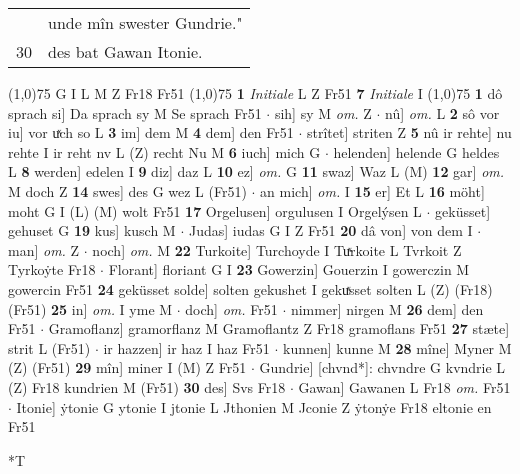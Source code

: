 \documentclass[8pt,a4paper,notitlepage]{article}
\begin{document}
\begin{table}[ht]
\begin{minipage}[t]{0.5\linewidth}
\begin{tabular}{rl}
 & unde mîn swester Gundrie."\\ 
30 & des bat Gawan Itonie.\\ 
\end{tabular}
\scriptsize
\line(1,0){75} \newline
G I L M Z Fr18 Fr51 \newline
\line(1,0){75} \newline
\textbf{1} \textit{Initiale} L Z Fr51  \textbf{7} \textit{Initiale} I  \newline
\line(1,0){75} \newline
\textbf{1} dô sprach si] Da sprach sy M Se sprach Fr51  $\cdot$ sih] sy M \textit{om.} Z  $\cdot$ nû] \textit{om.} L \textbf{2} sô vor iu] vor uͯch so L \textbf{3} im] dem M \textbf{4} dem] den Fr51  $\cdot$ strîtet] striten Z \textbf{5} nû ir rehte] nu rehte I ir reht nv L (Z) recht Nu M \textbf{6} iuch] mich G  $\cdot$ helenden] helende G heldes L \textbf{8} werden] edelen I \textbf{9} diz] daz L \textbf{10} ez] \textit{om.} G \textbf{11} swaz] Waz L (M) \textbf{12} gar] \textit{om.} M doch Z \textbf{14} swes] des G wez L (Fr51)  $\cdot$ an mich] \textit{om.} I \textbf{15} er] Et L \textbf{16} möht] moht G I (L) (M) wolt Fr51 \textbf{17} Orgelusen] orgulusen I Orgelýsen L  $\cdot$ geküsset] gehuset G \textbf{19} kus] kusch M  $\cdot$ Judas] iudas G I Z Fr51 \textbf{20} dâ von] von dem I  $\cdot$ man] \textit{om.} Z  $\cdot$ noch] \textit{om.} M \textbf{22} Turkoite] Turchoyde I Tuͯrkoite L Tvrkoit Z Tyrkoẏte Fr18  $\cdot$ Florant] floriant G I \textbf{23} Gowerzin] Gouerzin I gowerczin M gowercin Fr51 \textbf{24} geküsset solde] solten gekushet I gekuͯsset solten L (Z) (Fr18) (Fr51) \textbf{25} in] \textit{om.} I yme M  $\cdot$ doch] \textit{om.} Fr51  $\cdot$ nimmer] nirgen M \textbf{26} dem] den Fr51  $\cdot$ Gramoflanz] gramorflanz M Gramoflantz Z Fr18 gramoflans Fr51 \textbf{27} stæte] strit L (Fr51)  $\cdot$ ir hazzen] ir haz I haz Fr51  $\cdot$ kunnen] kunne M \textbf{28} mîne] Myner M (Z) (Fr51) \textbf{29} mîn] miner I (M) Z Fr51  $\cdot$ Gundrie] [chvnd*]: chvndre G kvndrie L (Z) Fr18 kundrien M (Fr51) \textbf{30} des] Svs Fr18  $\cdot$ Gawan] Gawanen L Fr18 \textit{om.} Fr51  $\cdot$ Itonie] ẏtonie G ytonie I jtonie L Jthonien M Jconie Z ẏtonẏe Fr18 eltonie en Fr51 \newline
\end{minipage}
\hspace{0.5cm}
\begin{minipage}[t]{0.5\linewidth}
\small
\begin{center}*T
\end{center}

\end{minipage}
\end{table}
\end{document}
